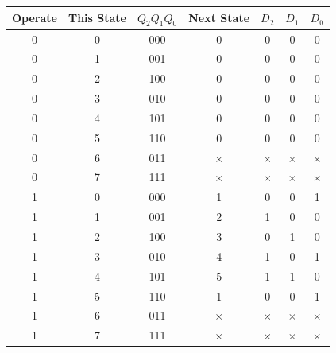 \documentclass[twocolumn,english]{article}
\providecommand{\tabularnewline}{\\}
\begin{document}
\noindent 
\begin{table}[H]
\noindent \centering{}%
\begin{tabular}{ccccccc}
\toprule 
{\footnotesize{}Operate} & {\footnotesize{}This State} & {\footnotesize{}$Q_{2}Q_{1}Q_{0}$} & {\footnotesize{}Next State} & {\footnotesize{}$D_{2}$} & {\footnotesize{}$D_{1}$} & {\footnotesize{}$D_{0}$}\tabularnewline
\midrule 
{\footnotesize{}0} & {\footnotesize{}0} & {\footnotesize{}000} & {\footnotesize{}0} & {\footnotesize{}0} & {\footnotesize{}0} & {\footnotesize{}0}\tabularnewline
{\footnotesize{}0} & {\footnotesize{}1} & {\footnotesize{}001} & {\footnotesize{}0} & {\footnotesize{}0} & {\footnotesize{}0} & {\footnotesize{}0}\tabularnewline
{\footnotesize{}0} & {\footnotesize{}2} & {\footnotesize{}100} & {\footnotesize{}0} & {\footnotesize{}0} & {\footnotesize{}0} & {\footnotesize{}0}\tabularnewline
{\footnotesize{}0} & {\footnotesize{}3} & {\footnotesize{}010} & {\footnotesize{}0} & {\footnotesize{}0} & {\footnotesize{}0} & {\footnotesize{}0}\tabularnewline
{\footnotesize{}0} & {\footnotesize{}4} & {\footnotesize{}101} & {\footnotesize{}0} & {\footnotesize{}0} & {\footnotesize{}0} & {\footnotesize{}0}\tabularnewline
{\footnotesize{}0} & {\footnotesize{}5} & {\footnotesize{}110} & {\footnotesize{}0} & {\footnotesize{}0} & {\footnotesize{}0} & {\footnotesize{}0}\tabularnewline
{\footnotesize{}0} & {\footnotesize{}6} & {\footnotesize{}011} & {\footnotesize{}$\times$} & {\footnotesize{}$\times$} & {\footnotesize{}$\times$} & {\footnotesize{}$\times$}\tabularnewline
{\footnotesize{}0} & {\footnotesize{}7} & {\footnotesize{}111} & {\footnotesize{}$\times$} & {\footnotesize{}$\times$} & {\footnotesize{}$\times$} & {\footnotesize{}$\times$}\tabularnewline
\midrule
{\footnotesize{}1} & {\footnotesize{}0} & {\footnotesize{}000} & {\footnotesize{}1} & {\footnotesize{}0} & {\footnotesize{}0} & {\footnotesize{}1}\tabularnewline
{\footnotesize{}1} & {\footnotesize{}1} & {\footnotesize{}001} & {\footnotesize{}2} & {\footnotesize{}1} & {\footnotesize{}0} & {\footnotesize{}0}\tabularnewline
{\footnotesize{}1} & {\footnotesize{}2} & {\footnotesize{}100} & {\footnotesize{}3} & {\footnotesize{}0} & {\footnotesize{}1} & {\footnotesize{}0}\tabularnewline
{\footnotesize{}1} & {\footnotesize{}3} & {\footnotesize{}010} & {\footnotesize{}4} & {\footnotesize{}1} & {\footnotesize{}0} & {\footnotesize{}1}\tabularnewline
{\footnotesize{}1} & {\footnotesize{}4} & {\footnotesize{}101} & {\footnotesize{}5} & {\footnotesize{}1} & {\footnotesize{}1} & {\footnotesize{}0}\tabularnewline
{\footnotesize{}1} & {\footnotesize{}5} & {\footnotesize{}110} & {\footnotesize{}1} & {\footnotesize{}0} & {\footnotesize{}0} & {\footnotesize{}1}\tabularnewline
{\footnotesize{}1} & {\footnotesize{}6} & {\footnotesize{}011} & {\footnotesize{}$\times$} & {\footnotesize{}$\times$} & {\footnotesize{}$\times$} & {\footnotesize{}$\times$}\tabularnewline
{\footnotesize{}1} & {\footnotesize{}7} & {\footnotesize{}111} & {\footnotesize{}$\times$} & {\footnotesize{}$\times$} & {\footnotesize{}$\times$} & {\footnotesize{}$\times$}\tabularnewline
\bottomrule
\end{tabular}
\end{table}
\end{document}
